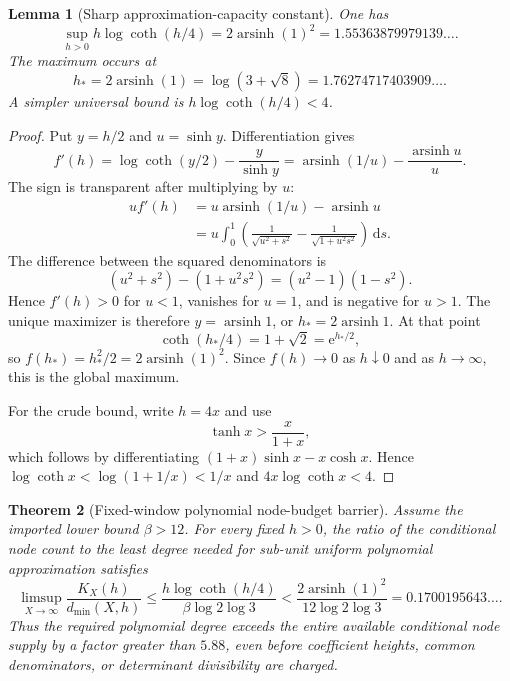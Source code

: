 \documentclass[11pt,oneside]{article}
\newtheorem{theorem}{Theorem}[section]
\newtheorem{lemma}[theorem]{Lemma}
\theoremstyle{definition}
\theoremstyle{remark}
\newcommand{\asinh}{\operatorname{arsinh}}
\newcommand{\e}{\mathrm e}
\newcommand{\dd}{\,\mathrm d}
\begin{document}
\begin{lemma}[Sharp approximation-capacity constant]
\label{lem:capacity-constant}
One has
\begin{equation}
 \sup_{h>0}h\log\coth(h/4)
 =2\asinh(1)^2
 =1.55363879979139\ldots.
 \label{eq:capacity-constant}
\end{equation}
The maximum occurs at
\[
  h_*=2\asinh(1)=\log(3+\sqrt8)=1.76274717403909\ldots.
\]
A simpler universal bound is $h\log\coth(h/4)<4$.
\end{lemma}

\begin{proof}
Put $y=h/2$ and $u=\sinh y$.  Differentiation gives
\[
 f'(h)=\log\coth(y/2)-\frac{y}{\sinh y}
      =\asinh(1/u)-\frac{\asinh u}{u}.
\]
The sign is transparent after multiplying by $u$:
\begin{align*}
 u f'(h)
 &=u\asinh(1/u)-\asinh u\\
 &=u\int_0^1\left(
     \frac1{\sqrt{u^2+s^2}}
     -\frac1{\sqrt{1+u^2s^2}}
   \right)\dd s.
\end{align*}
The difference between the squared denominators is
\[
 (u^2+s^2)-(1+u^2s^2)=(u^2-1)(1-s^2).
\]
Hence $f'(h)>0$ for $u<1$, vanishes for $u=1$, and is negative for $u>1$.  The unique maximizer is therefore $y=\asinh1$, or $h_*=2\asinh1$.  At that point
\[
 \coth(h_*/4)=1+\sqrt2=\e^{h_*/2},
\]
so $f(h_*)=h_*^2/2=2\asinh(1)^2$.  Since $f(h)\to0$ as $h\downarrow0$ and as $h\to\infty$, this is the global maximum.

For the crude bound, write $h=4x$ and use
\[
 \tanh x>\frac{x}{1+x},
\]
which follows by differentiating $(1+x)\sinh x-x\cosh x$.  Hence
$\log\coth x<\log(1+1/x)<1/x$ and $4x\log\coth x<4$.
\end{proof}

\begin{theorem}[Fixed-window polynomial node-budget barrier]
\label{thm:node-budget-barrier}
Assume the imported lower bound $\beta>12$.  For every fixed $h>0$, the ratio of the conditional node count to the least degree needed for sub-unit uniform polynomial approximation satisfies
\begin{equation}
 \limsup_{X\to\infty}\frac{K_X(h)}{d_{\min}(X,h)}
 \le
 \frac{h\log\coth(h/4)}{\beta\log2\log3}
 <\frac{2\asinh(1)^2}{12\log2\log3}
 =0.1700195643\ldots.
 \label{eq:node-degree-ratio}
\end{equation}
Thus the required polynomial degree exceeds the entire available conditional node supply by a factor greater than $5.88$, even before coefficient heights, common denominators, or determinant divisibility are charged.
\end{theorem}
\end{document}
